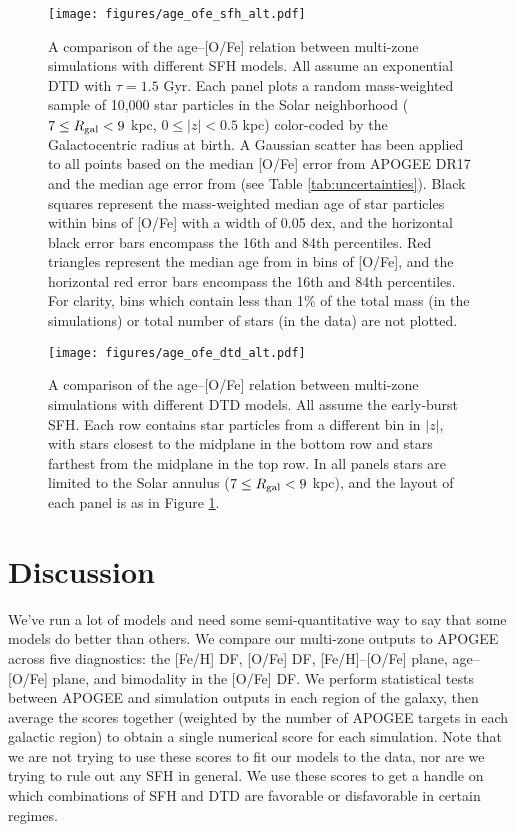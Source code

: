 \documentclass[twocolumn,twocolappendix,linenumbers]{aastex631}
\begin{document}
\begin{figure}
    \centering
    \texttt{[image: figures/age\_ofe\_sfh\_alt.pdf]}
    \caption{A comparison of the age--[O/Fe] relation between multi-zone simulations with different SFH models. All assume an exponential DTD with $\tau=1.5$ Gyr. Each panel plots a random mass-weighted sample of 10,000 star particles in the Solar neighborhood ($7\leq R_{\rm gal}<9$ kpc, $0\leq|z|<0.5$ kpc) color-coded by the Galactocentric radius at birth. A Gaussian scatter has been applied to all points based on the median [O/Fe] error from APOGEE DR17 and the median age error from \citet{Leung2023-Ages} (see Table \ref{tab:uncertainties}). Black squares represent the mass-weighted median age of star particles within bins of [O/Fe] with a width of 0.05 dex, and the horizontal black error bars encompass the 16th and 84th percentiles. Red triangles represent the median age from \citet{Leung2023-Ages} in bins of [O/Fe], and the horizontal red error bars encompass the 16th and 84th percentiles. For clarity, bins which contain less than 1\% of the total mass (in the simulations) or total number of stars (in the data) are not plotted.}
    \label{fig:age-ofe-sfh}
\end{figure}

\begin{figure*}
    \centering
    \texttt{[image: figures/age\_ofe\_dtd\_alt.pdf]}
    \caption{A comparison of the age--[O/Fe] relation between multi-zone simulations with different DTD models. All assume the early-burst SFH. Each row contains star particles from a different bin in $|z|$, with stars closest to the midplane in the bottom row and stars farthest from the midplane in the top row. In all panels stars are limited to the Solar annulus ($7\leq R_{\rm gal}<9$ kpc), and the layout of each panel is as in Figure \ref{fig:age-ofe-sfh}.}
    \label{fig:age-ofe-dtd}
\end{figure*}


\section{Discussion}
\label{sec:discussion}

We've run a lot of models and need some semi-quantitative way to say that some models do better than others. We compare our multi-zone outputs to APOGEE across five diagnostics: the [Fe/H] DF, [O/Fe] DF, [Fe/H]--[O/Fe] plane, age--[O/Fe] plane, and bimodality in the [O/Fe] DF. We perform statistical tests between APOGEE and simulation outputs in each region of the galaxy, then average the scores together (weighted by the number of APOGEE targets in each galactic region) to obtain a single numerical score for each simulation. Note that we are not trying to use these scores to fit our models to the data, nor are we trying to rule out any SFH in general. We use these scores to get a handle on which combinations of SFH and DTD are favorable or disfavorable in certain regimes. 
\end{document}
